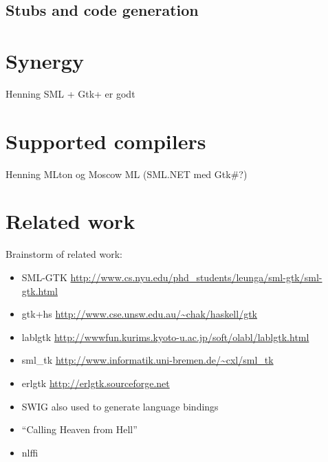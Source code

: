 \documentclass[workingdraft,endnotes]{usetex-v1}
\begin{document}
\subsection{Stubs and code generation}
\label{sec:stubs-code-gener}





\section{Synergy}
\label{sec:synergy}

\begin{ednote}{Henning}
  SML + Gtk+ er godt
\end{ednote}



\section{Supported \sml compilers}
\label{sec:supp-sml-comp}

\begin{ednote}{Henning}
  MLton og Moscow ML (SML.NET med Gtk\#?)
\end{ednote}


\section{Related work}
\label{sec:related-work}

 Brainstorm of related work:
\begin{itemize}
\item SML-GTK 
\url{http://www.cs.nyu.edu/phd_students/leunga/sml-gtk/sml-gtk.html}

\item gtk+hs
\url{http://www.cse.unsw.edu.au/~chak/haskell/gtk}

\item lablgtk
\url{http://wwwfun.kurims.kyoto-u.ac.jp/soft/olabl/lablgtk.html}

\item sml\_tk
\url{http://www.informatik.uni-bremen.de/~cxl/sml_tk}

\item erlgtk
\url{http://erlgtk.sourceforge.net}


\item SWIG also used to generate language bindings

\item ``Calling Heaven from Hell''

\item nlffi

\end{itemize}
\end{document}
